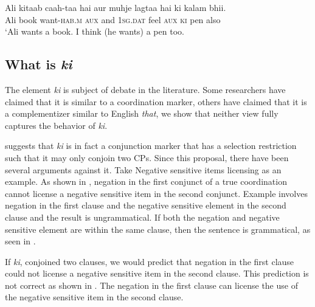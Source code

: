 \documentclass[output=paper]{langscibook}
\begin{document}
\ea 
    \gll Ali kitaab caah-taa hai aur muhje lagtaa hai ki kalam bhii.\\
    Ali book want-\textsc{hab.m} \textsc{aux} and \textsc{1sg.dat} feel \textsc{aux} \textsc{ki} pen also\\
    \glt `Ali wants a book. I think (he wants) a pen too.
\z 
\subsection{What is \emph{ki}}
The element \emph{ki} is subject of debate in the literature. Some researchers have claimed that it is similar to a coordination marker, others have claimed that it is a complementizer similar to English \emph{that}, we show that neither view fully captures the behavior of \emph{ki}. 

\cite{dwivedi94} suggests that \emph{ki} is in fact a conjunction marker that has a selection restriction such that it may only conjoin two CPs. Since this proposal, there have been several arguments against it. Take Negative sensitive items licensing as an example. As shown in , negation in the first conjunct of a true coordination cannot license a negative sensitive item in the second conjunct. Example  involves negation in the first clause and the negative sensitive element in the second clause and the result is ungrammatical. If both the negation and negative sensitive element are within the same clause, then the sentence is grammatical, as seen in .

\ea \label{maex21}
    \z 
\z 
If \emph{ki}, conjoined two clauses, we would predict that negation in the first clause could not license a negative sensitive item in the second clause. This prediction is not correct as shown in . The negation in the first clause can license the use of the negative sensitive item in the second clause.  
\end{document}
